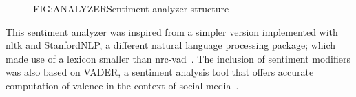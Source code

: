 \begin{figure}[Sentiment analyzer]{FIG:ANALYZER}{Sentiment analyzer structure}\hspace*{1.4em}
\end{figure}

This sentiment analyzer was inspired from a simpler version implemented with \acs{nltk} and StanfordNLP, a different natural language processing package; which made use of a lexicon smaller than \acs{nrc}-\acs{vad}~\cite{SENTIMENTANALYSIS}. The inclusion of sentiment modifiers was also based on VADER, a sentiment analysis tool that offers accurate computation of valence in the context of social media~\cite{VADER}.